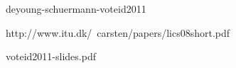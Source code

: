 deyoung-schuermann-voteid2011

http://www.itu.dk/~carsten/papers/lics08short.pdf

voteid2011-slides.pdf